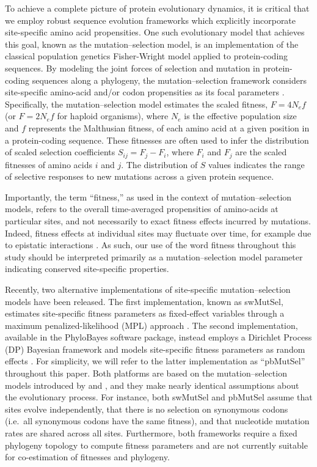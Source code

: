 \documentclass[11pt]{article}
\begin{document}
To achieve a complete picture of protein evolutionary dynamics, it is critical that we employ robust sequence evolution frameworks which explicitly incorporate site-specific amino acid propensities. One such evolutionary model that achieves this goal, known as the mutation--selection model, is an implementation of the classical population genetics  Fisher-Wright model \citep{Fisher1930,Wright1931} applied to protein-coding sequences. By modeling the joint forces of selection and mutation in protein-coding sequences along a phylogeny, the mutation--selection framework considers site-specific amino-acid and/or codon propensities as its focal parameters \citep{HalpernBruno1998, McCandlish2014}. Specifically, the mutation--selection model estimates the scaled fitness, $F = 4N_ef$ (or $F=2N_ef$ for haploid organisms), where $N_e$ is the effective population size and $f$ represents the Malthusian fitness, of each amino acid at a given position in a protein-coding sequence. These fitnesses are often used to infer the distribution of scaled selection coefficients $S_{ij} = F_j - F_i$, where $F_i$ and $F_j$ are the scaled fitnesses of amino acids $i$ and $j$. The distribution of $S$ values indicates the range of selective responses to new mutations across a given protein sequence.

Importantly, the term ``fitness,'' as used in the context of mutation--selection models, refers to the overall time-averaged propensities of amino-acids at particular sites, and not necessarily to exact fitness effects incurred by mutations. Indeed, fitness effects at individual sites may fluctuate over time, for example due to epistatic interactions \citep{Weinreich2006,Pollacketal2012, DraghiPlotkin2013, GongSuchardBloom2013, Ashenbergetal2013,McCandlish2014,Shahetal2015}. As such, our use of the word fitness throughout this study should be interpreted primarily as a mutation--selection model parameter indicating conserved site-specific properties.

Recently, two alternative implementations of site-specific mutation--selection models have been released. The first implementation, known as swMutSel, estimates site-specific fitness parameters as fixed-effect variables through a maximum penalized-likelihood (MPL) approach \citep{Tamurietal2012,Tamurietal2014}. The second implementation, available in the PhyloBayes software package, instead employs a Dirichlet Process (DP) Bayesian framework and models site-specific fitness parameters as random effects \citep{Rodrigueetal2010,RodrigueLartillot2014}. For simplicity, we will refer to the latter implementation as ``pbMutSel'' throughout this paper. Both platforms are based on the mutation--selection models introduced by \citet{HalpernBruno1998} and \citet{YangNielsen2008}, and they make nearly identical assumptions about the evolutionary process. For instance, both swMutSel and pbMutSel assume that sites evolve independently, that there is no selection on synonymous codons (i.e.\ all synonymous codons have the same fitness), and that nucleotide mutation rates are shared across all sites. Furthermore, both frameworks require a fixed phylogeny topology to compute fitness parameters and are not currently suitable for co-estimation of fitnesses and phylogeny.
\end{document}
